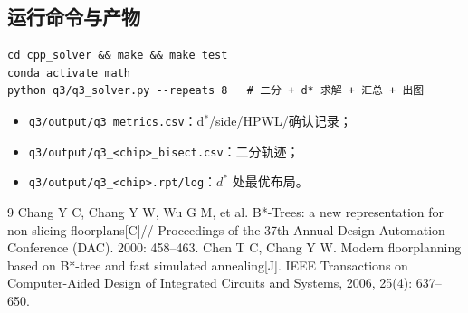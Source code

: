 \documentclass[12pt,a4paper]{article}
\begin{document}
\subsection{运行命令与产物}

{\small
\begin{verbatim}
cd cpp_solver && make && make test
conda activate math
python q3/q3_solver.py --repeats 8   # 二分 + d* 求解 + 汇总 + 出图
\end{verbatim}
}

\begin{itemize}
    \item \texttt{q3/output/q3\_metrics.csv}：d$^*$/side/HPWL/确认记录；
    \item \texttt{q3/output/q3\_<chip>\_bisect.csv}：二分轨迹；
    \item \texttt{q3/output/q3\_<chip>.rpt/log}：$d^*$ 处最优布局。
\end{itemize}

\begin{thebibliography}{9}
 Chang Y C, Chang Y W, Wu G M, et al. B*-Trees: a new
  representation for non-slicing floorplans[C]// Proceedings of the 37th
  Annual Design Automation Conference (DAC). 2000: 458--463.
 Chen T C, Chang Y W. Modern floorplanning based on B*-tree
  and fast simulated annealing[J]. IEEE Transactions on Computer-Aided
  Design of Integrated Circuits and Systems, 2006, 25(4): 637--650.
\end{thebibliography}
\end{document}
